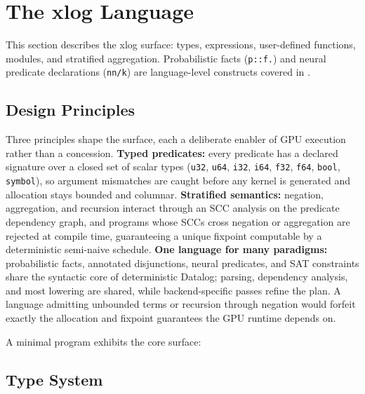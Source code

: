 \section{The xlog Language}\label{sec:lang}

This section describes the xlog surface: types, expressions, user-defined functions, modules, and stratified aggregation. Probabilistic facts (\texttt{p::f.}) and neural predicate declarations (\texttt{nn/k}) are language-level constructs covered in .

\subsection{Design Principles}

Three principles shape the surface, each a deliberate enabler of GPU execution rather than a concession. \textbf{Typed predicates:} every predicate has a declared signature over a closed set of scalar types (\texttt{u32}, \texttt{u64}, \texttt{i32}, \texttt{i64}, \texttt{f32}, \texttt{f64}, \texttt{bool}, \texttt{symbol}), so argument mismatches are caught before any kernel is generated and allocation stays bounded and columnar. \textbf{Stratified semantics:} negation, aggregation, and recursion interact through an SCC analysis on the predicate dependency graph, and programs whose SCCs cross negation or aggregation are rejected at compile time, guaranteeing a unique fixpoint computable by a deterministic semi-naive schedule. \textbf{One language for many paradigms:} probabilistic facts, annotated disjunctions, neural predicates, and SAT constraints share the syntactic core of deterministic Datalog; parsing, dependency analysis, and most lowering are shared, while backend-specific passes refine the plan. A language admitting unbounded terms or recursion through negation would forfeit exactly the allocation and fixpoint guarantees the GPU runtime depends on.

A minimal program exhibits the core surface:



\subsection{Type System}\label{sec:lang:types}

